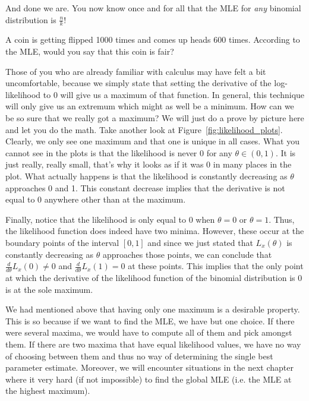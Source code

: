 And done we are. You now know once and for all that the MLE for \emph{any} binomial distribution is $ \frac{n}{k} $!

\begin{Exercise}
A coin is getting flipped 1000 times and comes up heads 600 times. According to the MLE, would you say that this coin is fair?
\end{Exercise}

Those of you who are already familiar with calculus may have felt a bit uncomfortable, because we simply state that setting the derivative of the log-likelihood
to 0 will give us a maximum of that function. In general, this technique will only give us an extremum which might as well be a minimum. How can we be so sure that
we really got a maximum? We will just do a prove by picture here and let you do the math. Take another look at Figure~\ref{fig:likelihood_plots}. Clearly, we only
see one maximum and that one is unique in all cases. What you cannot see in the plots is that the likelihood is never 0 for any $ \theta \in (0,1) $. It is just
really, really small, that's why it looks as if it was 0 in many places in the plot. What actually happens is that the likelihood is constantly decreasing as
$ \theta $ approaches 0 and 1. This constant decrease implies that the derivative is not equal to $ 0 $ anywhere other than at the maximum.

Finally, notice that the likelihood is only equal to 0 when $ \theta = 0 $ or $ \theta = 1 $. Thus, the likelihood function does indeed have two minima. However, these 
occur at the boundary points of the interval $ [0,1] $ and since we just stated that $ L_{x}(\theta) $ is constantly decreasing as $ \theta $ approaches those points,
we can conclude that $ \frac{d}{d\theta}L_{x}(0) \not = 0 $ and $ \frac{d}{d\theta}L_{x}(1) = 0 $ at these points. This implies that the only point at which the
derivative of the likelihood function of the binomial distribution is $ 0 $ is at the sole maximum.

We had mentioned above that having only one maximum is a desirable property. This is so because if we want to find the MLE, we have but one choice. If there were
several maxima, we would have to compute all of them and pick amongst them. If there are two maxima that have equal likelihood values, we have no way of choosing
between them and thus no way of determining the single best parameter estimate. Moreover, we will encounter situations in the next chapter where it very hard (if not
impossible) to find the global MLE (i.e. the MLE at the highest maximum).

